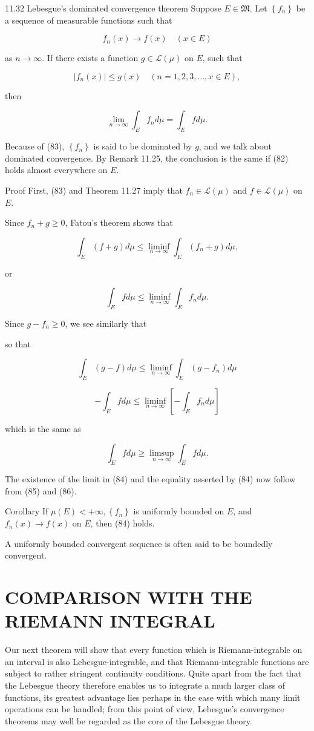 \documentclass[10pt]{article}
\begin{document}
11.32 Lebesgue's dominated convergence theorem Suppose $E \in \mathfrak{M}$. Let $\left\{f_{n}\right\}$ be a sequence of measurable functions such that

$$
f_{n}(x) \rightarrow f(x) \quad(x \in E)
$$

as $n \rightarrow \infty$. If there exists a function $g \in \mathscr{L}(\mu)$ on $E$, such that

$$
\left|f_{n}(x)\right| \leq g(x) \quad(n=1,2,3, \ldots, x \in E),
$$

then

$$
\lim _{n \rightarrow \infty} \int_{E} f_{n} d \mu=\int_{E} f d \mu .
$$

Because of (83), $\left\{f_{n}\right\}$ is said to be dominated by $g$, and we talk about dominated convergence. By Remark 11.25, the conclusion is the same if (82) holds almost everywhere on $E$.

Proof First, (83) and Theorem 11.27 imply that $f_{n} \in \mathscr{L}(\mu)$ and $f \in \mathscr{L}(\mu)$ on $E$.

Since $f_{n}+g \geq 0$, Fatou's theorem shows that

$$
\int_{E}(f+g) d \mu \leq \liminf _{n \rightarrow \infty} \int_{E}\left(f_{n}+g\right) d \mu,
$$

or

$$
\int_{E} f d \mu \leq \liminf _{n \rightarrow \infty} \int_{E} f_{n} d \mu .
$$

Since $g-f_{n} \geq 0$, we see similarly that

so that

$$
\int_{E}(g-f) d \mu \leq \liminf _{n \rightarrow \infty} \int_{E}\left(g-f_{n}\right) d \mu
$$

$$
-\int_{E} f d \mu \leq \liminf _{n \rightarrow \infty}\left[-\int_{E} f_{n} d \mu\right]
$$

which is the same as

$$
\int_{E} f d \mu \geq \limsup _{n \rightarrow \infty} \int_{E} f d \mu .
$$

The existence of the limit in (84) and the equality asserted by (84) now follow from (85) and (86).

Corollary If $\mu(E)<+\infty,\left\{f_{n}\right\}$ is uniformly bounded on $E$, and $f_{n}(x) \rightarrow f(x)$ on $E$, then (84) holds.

A uniformly bounded convergent sequence is often said to be boundedly convergent.

\section{COMPARISON WITH THE RIEMANN INTEGRAL}
Our next theorem will show that every function which is Riemann-integrable on an interval is also Lebesgue-integrable, and that Riemann-integrable functions are subject to rather stringent continuity conditions. Quite apart from the fact that the Lebesgue theory therefore enables us to integrate a much larger class of functions, its greatest advantage lies perhaps in the ease with which many limit operations can be handled; from this point of view, Lebesgue's convergence theorems may well be regarded as the core of the Lebesgue theory.
\end{document}
